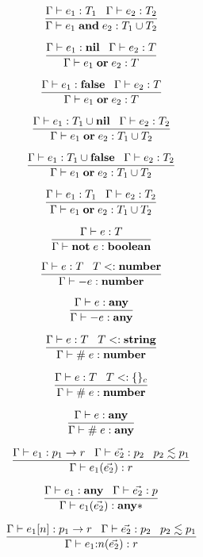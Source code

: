 \[
\dfrac{\Gamma \vdash e_{1}:T_{1} \;\;\;
       \Gamma \vdash e_{2}:T_{2}}
      {\Gamma \vdash e_{1} \; \mathbf{and} \; e_{2}:T_{1} \cup T_{2}}
\]

\[
\dfrac{\Gamma \vdash e_{1}:\mathbf{nil} \;\;\;
       \Gamma \vdash e_{2}:T}
      {\Gamma \vdash e_{1} \; \mathbf{or} \; e_{2}:T}
\]

\[
\dfrac{\Gamma \vdash e_{1}:\mathbf{false} \;\;\;
       \Gamma \vdash e_{2}:T}
      {\Gamma \vdash e_{1} \; \mathbf{or} \; e_{2}:T}
\]

\[
\dfrac{\Gamma \vdash e_{1}:T_{1} \cup \mathbf{nil} \;\;\;
       \Gamma \vdash e_{2}:T_{2}}
      {\Gamma \vdash e_{1} \; \mathbf{or} \; e_{2}:T_{1} \cup T_{2}}
\]

\[
\dfrac{\Gamma \vdash e_{1}:T_{1} \cup \mathbf{false} \;\;\;
       \Gamma \vdash e_{2}:T_{2}}
      {\Gamma \vdash e_{1} \; \mathbf{or} \; e_{2}:T_{1} \cup T_{2}}
\]

\[
\dfrac{\Gamma \vdash e_{1}:T_{1} \;\;\;
       \Gamma \vdash e_{2}:T_{2}}
      {\Gamma \vdash e_{1} \; \mathbf{or} \; e_{2}:T_{1} \cup T_{2}}
\]

\[
\dfrac{\Gamma \vdash e:T}
      {\Gamma \vdash \mathbf{not} \; e:\mathbf{boolean}}
\]

\[
\dfrac{\Gamma \vdash e:T \;\;\;
       T <: \mathbf{number}}
      {\Gamma \vdash - e:\mathbf{number}}
\]

\[
\dfrac{\Gamma \vdash e:\mathbf{any}}
      {\Gamma \vdash - e:\mathbf{any}}
\]

\[
\dfrac{\Gamma \vdash e:T \;\;\;
       T <: \mathbf{string}}
      {\Gamma \vdash \# \; e:\mathbf{number}}
\]

\[
\dfrac{\Gamma \vdash e:T \;\;\;
       T <: \{\}_{c}}
      {\Gamma \vdash \# \; e:\mathbf{number}}
\]

\[
\dfrac{\Gamma \vdash e:\mathbf{any}}
      {\Gamma \vdash \# \; e:\mathbf{any}}
\]

\[
\dfrac{\Gamma \vdash e_{1}:p_{1} \rightarrow r \;\;\;
       \Gamma \vdash \vec{e_{2}}:p_{2} \;\;\;
       p_{2} \lesssim p_{1}}
      {\Gamma \vdash e_{1}(\vec{e_{2}}):r}
\]

\[
\dfrac{\Gamma \vdash e_{1}:\mathbf{any} \;\;\;
       \Gamma \vdash \vec{e_{2}}:p}
      {\Gamma \vdash e_{1}(\vec{e_{2}}):\mathbf{any}{*}}
\]

\[
\dfrac{\Gamma \vdash e_{1}[n]:p_{1} \rightarrow r \;\;\;
       \Gamma \vdash \vec{e_{2}}:p_{2} \;\;\;
       p_{2} \lesssim p_{1}}
      {\Gamma \vdash e_{1}{:}n(\vec{e_{2}}):r}
\]


